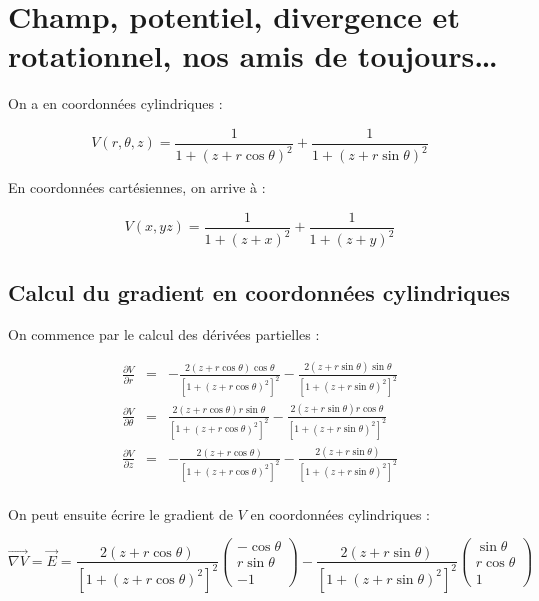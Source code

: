 \documentclass[a4paper, 11pt]{report} %
\newcommand{\vect}{\overrightarrow}
\begin{document}
\section{Champ, potentiel, divergence et rotationnel, nos amis de toujours\ldots} %

On a en coordonnées cylindriques :

$$V(r, \theta, z) = \frac{1}{1+(z+r\cos\theta)^2} + \frac{1}{1+(z+r\sin\theta)^2}$$

En coordonnées cartésiennes, on arrive à :

$$V(x,yz) = \frac{1}{1+(z+x)^2} + \frac{1}{1+(z+y)^2}$$

\subsection{Calcul du gradient en coordonnées cylindriques}

On commence par le calcul des dérivées partielles :

\begin{eqnarray*}
    \frac{\partial V}{\partial r}   & = & -\frac{2(z+r\cos\theta)\cos\theta}{\left[1+(z+r\cos\theta)^2\right]^2} - \frac{2(z+r\sin\theta)\sin\theta}{\left[1+(z+r\sin\theta)^2\right]^2}\\
    \frac{\partial V}{\partial \theta}   & = & \frac{2(z+r\cos\theta)r\sin\theta}{\left[1+(z+r\cos\theta)^2\right]^2} - \frac{2(z+r\sin\theta)r\cos\theta}{\left[1+(z+r\sin\theta)^2\right]^2}\\
    \frac{\partial V}{\partial z}   & = & -\frac{2(z+r\cos\theta)}{\left[1+(z+r\cos\theta)^2\right]^2} - \frac{2(z+r\sin\theta)}{\left[1+(z+r\sin\theta)^2\right]^2}\\
\end{eqnarray*}

On peut ensuite écrire le gradient de $V$ en coordonnées cylindriques :

$$\vect{\nabla V} = \vect{E} = \frac{2(z+r\cos\theta)}{\left[1+(z+r\cos\theta)^2\right]^2}
\begin{pmatrix}
    -\cos\theta\\
    r\sin\theta\\
    -1
\end{pmatrix}
- \frac{2(z+r\sin\theta)}{\left[1+(z+r\sin\theta)^2\right]^2}
\begin{pmatrix}
    \sin\theta\\
    r\cos\theta\\
    1
\end{pmatrix}
$$
\end{document}
